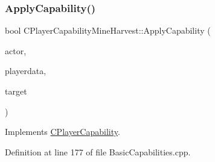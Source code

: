 \subsubsection{\texorpdfstring{Apply\+Capability()}{ApplyCapability()}}
{\footnotesize\ttfamily bool C\+Player\+Capability\+Mine\+Harvest\+::\+Apply\+Capability (\begin{DoxyParamCaption}\item[{std\+::shared\+\_\+ptr$<$ \hyperlink{classCPlayerAsset}{C\+Player\+Asset} $>$}]{actor,  }\item[{std\+::shared\+\_\+ptr$<$ \hyperlink{classCPlayerData}{C\+Player\+Data} $>$}]{playerdata,  }\item[{std\+::shared\+\_\+ptr$<$ \hyperlink{classCPlayerAsset}{C\+Player\+Asset} $>$}]{target }\end{DoxyParamCaption})\hspace{0.3cm}{\ttfamily [virtual]}}



Implements \hyperlink{classCPlayerCapability_a2ca6fd7fbd9c0178f1cf1d049c63825f}{C\+Player\+Capability}.



Definition at line 177 of file Basic\+Capabilities.\+cpp.


